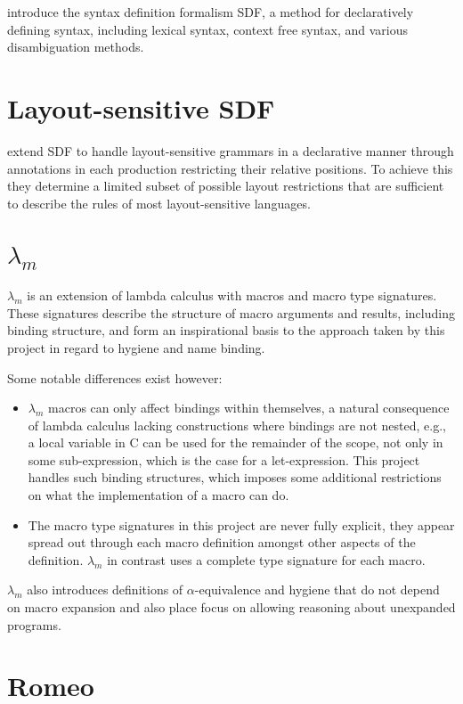 \documentclass{kththesis}
\begin{document}
\textcite{Heering1989} introduce the syntax definition formalism SDF, a method for declaratively defining syntax, including lexical syntax, context free syntax, and various disambiguation methods.

\section{Layout-sensitive SDF}

\textcite{Erdweg2013} extend SDF to handle layout-sensitive grammars in a declarative manner through annotations in each production restricting their relative positions. To achieve this they determine a limited subset of possible layout restrictions that are sufficient to describe the rules of most layout-sensitive languages.

\section{$\lambda_m$}

$\lambda_m$ \cite{Herman2010} is an extension of lambda calculus with macros and macro type signatures. These signatures describe the structure of macro arguments and results, including binding structure, and form an inspirational basis to the approach taken by this project in regard to hygiene and name binding.

Some notable differences exist however:
\begin{itemize}
  \item $\lambda_m$ macros can only affect bindings within themselves, a natural consequence of lambda calculus lacking constructions where bindings are not nested, e.g., a local variable in C can be used for the remainder of the scope, not only in some sub-expression, which is the case for a let-expression. This project handles such binding structures, which imposes some additional restrictions on what the implementation of a macro can do.
  \item The macro type signatures in this project are never fully explicit, they appear spread out through each macro definition amongst other aspects of the definition. $\lambda_m$ in contrast uses a complete type signature for each macro.
\end{itemize}

$\lambda_m$ also introduces definitions of $\alpha$-equivalence and hygiene that do not depend on macro expansion and also place focus on allowing reasoning about unexpanded programs.

\section{Romeo}
\end{document}
